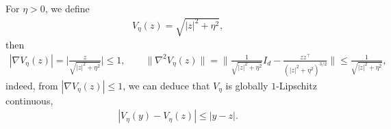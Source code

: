 \documentclass[11pt,reqno]{amsart}
\numberwithin{equation}{section}
\begin{document}
For $\eta>0$, we define
\begin{align}\label{vz}
V_\eta(z)=\sqrt{|z|^2+\eta^2},
\end{align}
then
\begin{align}\label{grad}
	|\nabla V_\eta(z)|
	=\bigg|\frac{z}{\sqrt{|z|^2+\eta^2}}\bigg|\leq1,\quad  \quad
	\|\nabla^2V_\eta(z)\|
	=\bigg\|\frac{1}{\sqrt{|z|^2+\eta^2}}I_{d}
	-\frac{zz^{\top}}
	{(|z|^2+\eta^2)^{3/2}}\bigg\|\leq
	\frac{1}{\sqrt{|z|^2+\eta^2}}, 
\end{align}
indeed, from $|\nabla V_\eta(z)|\leq1$, we can deduce that $V_\eta$ is globally $1$-Lipschitz continuous,
\begin{align}\label{v-lip}
	|V_\eta(y)-V_\eta(z)|\leq|y-z|.
\end{align}
\end{document}
